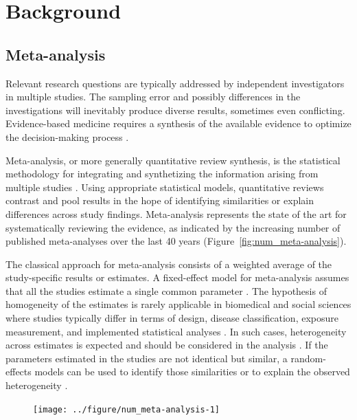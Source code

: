 \documentclass[11pt,a4paper,twoside,openany]{book}\usepackage{knitr}
\begin{document}
{\chapter{Background}

\section{Meta-analysis}

Relevant research questions are typically addressed by independent investigators in multiple studies. The sampling error and possibly differences in the investigations will inevitably produce diverse results, sometimes even conflicting. Evidence-based medicine requires a synthesis of the available evidence to optimize the decision-making process \citep{haidich2010meta}. 

Meta-analysis, or more generally quantitative review synthesis, is the statistical methodology for integrating and synthetizing the information arising from multiple studies \citep{borenstein2009references}. Using appropriate statistical models, quantitative reviews contrast and pool results in the hope of identifying similarities or explain differences across study findings. Meta-analysis represents the state of the art for systematically reviewing the evidence, as indicated by the increasing number of published meta-analyses over the last 40 years (Figure~\ref{fig:num_meta-analysis}).

The classical approach for meta-analysis consists of a weighted average of the study-specific results or estimates. A fixed-effect model for meta-analysis assumes that all the studies estimate a single common parameter \citep{rice2017re}. The hypothesis of homogeneity of the estimates is rarely applicable in biomedical and social sciences where studies typically differ in terms of design, disease classification, exposure measurement, and implemented statistical analyses \citep{colditz1995heterogeneity}. In such cases, heterogeneity across estimates is expected and should be considered in the analysis \citep{higgins2009re}. If the parameters estimated in the studies are not identical but similar, a random-effects models can be used to identify those similarities or to explain the observed heterogeneity \citep{higgins2009re}.


\begin{knitrout}
\color{fgcolor}\begin{figure}[ht!]

{\centering \texttt{[image: ../figure/num\_meta-analysis-1]} 

}
\end{figure}
\end{knitrout}}
\end{document}
